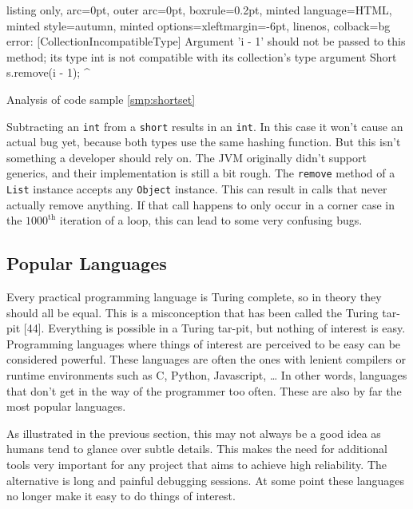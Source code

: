 \documentclass[a4paper, 16pt, oneside]{Thesis}
\begin{document}
\begin{code}
  \begin{tcblisting}{listing only, 
  arc=0pt,
  outer arc=0pt, 
  boxrule=0.2pt,
  minted language=HTML,
  minted style=autumn,
  minted options={xleftmargin=-6pt, linenos},
  colback=bg }
error: [CollectionIncompatibleType] Argument 'i - 1' should not be 
passed to this method; its type int is not compatible with its 
collection's type argument Short
      s.remove(i - 1);
              ^
\end{tcblisting}
\caption{Analysis of code sample \ref{smp:shortset}} \label{smp:shortset_f}
\end{code}

Subtracting an \texttt{int} from a \texttt{short} results in an
\texttt{int}. In this case it won't cause an actual bug yet, because
both types use the same hashing function. But this isn't something a
developer should rely on. The JVM originally didn't support generics,
and their implementation is still a bit rough. The \texttt{remove}
method of a \texttt{List} instance accepts any \texttt{Object} instance.
This can result in calls that never actually remove anything. If that
call happens to only occur in a corner case in the \(1000^{\text{th}}\)
iteration of a loop, this can lead to some very confusing bugs.

\subsection{Popular Languages}\label{popular-languages}

Every practical programming language is Turing complete, so in theory
they should all be equal. This is a misconception that has been called
the Turing tar-pit {[}44{]}. Everything is possible in a Turing tar-pit,
but nothing of interest is easy. Programming languages where things of
interest are perceived to be easy can be considered powerful. These
languages are often the ones with lenient compilers or runtime
environments such as C, Python, Javascript, \ldots{} In other words,
languages that don't get in the way of the programmer too often. These
are also by far the most popular languages.

As illustrated in the previous section, this may not always be a good
idea as humans tend to glance over subtle details. This makes the need
for additional tools very important for any project that aims to achieve
high reliability. The alternative is long and painful debugging
sessions. At some point these languages no longer make it easy to do
things of interest.
\end{document}
